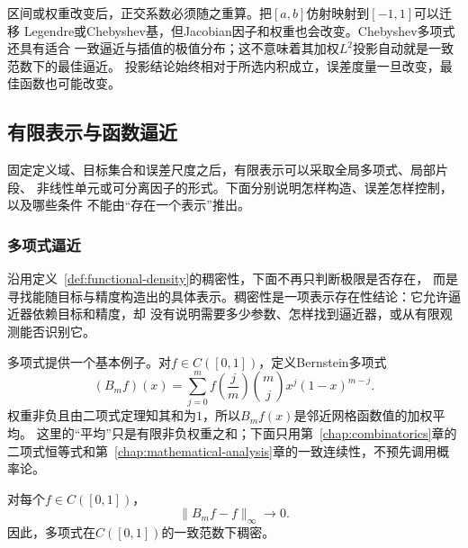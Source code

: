 区间或权重改变后，正交系数必须随之重算。把$[a,b]$仿射映射到$[-1,1]$可以迁移
Legendre或Chebyshev基，但Jacobian因子和权重也会改变。Chebyshev多项式还具有适合
一致逼近与插值的极值分布；这不意味着其加权$L^2$投影自动就是一致范数下的最佳逼近。
投影结论始终相对于所选内积成立，误差度量一旦改变，最佳函数也可能改变。

\subsection{有限表示与函数逼近}
\label{sec:functional-approximation-capacity-representation}

固定定义域、目标集合和误差尺度之后，有限表示可以采取全局多项式、局部片段、
非线性单元或可分离因子的形式。下面分别说明怎样构造、误差怎样控制，以及哪些条件
不能由“存在一个表示”推出。

\subsubsection{多项式逼近}

沿用定义~\ref{def:functional-density}的稠密性，下面不再只判断极限是否存在，
而是寻找能随目标与精度构造出的具体表示。稠密性是一项表示存在性结论：它允许逼近器依赖目标和精度，却
没有说明需要多少参数、怎样找到逼近器，或从有限观测能否识别它。

多项式提供一个基本例子。对$f\in C([0,1])$，定义Bernstein多项式
\begin{equation}
  (B_mf)(x)
  =
  \sum_{j=0}^{m}
  f\left(\frac{j}{m}\right)
\binom{m}{j}x^j(1-x)^{m-j}.
  \label{eq:functional-bernstein-polynomial}
\end{equation}
权重非负且由二项式定理知其和为$1$，所以$B_mf(x)$是邻近网格函数值的加权平均。
这里的“平均”只是有限非负权重之和；下面只用第~\ref{chap:combinatorics}章的
二项式恒等式和第~\ref{chap:mathematical-analysis}章的一致连续性，不预先调用概率论。

\begin{theorem}[Bernstein逼近定理]
\label{thm:functional-weierstrass-bernstein}
对每个$f\in C([0,1])$，
\[
  \lVert B_mf-f\rVert_{\infty}\longrightarrow0.
\]
因此，多项式在$C([0,1])$的一致范数下稠密。
\end{theorem}

